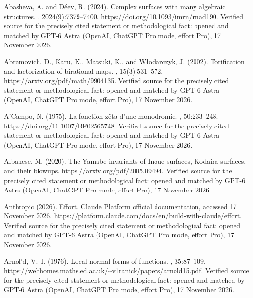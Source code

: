 \begin{thebibliography}{}

Abasheva, A. and D{\'e}ev, R. (2024).
\newblock Complex surfaces with many algebraic structures.
, 2024(9):7379--7400.
\newblock \url{https://doi.org/10.1093/imrn/rnad190}. Verified source for the precisely cited statement or methodological fact: opened and matched by GPT-6 Astra (OpenAI, ChatGPT Pro mode, effort Pro), 17 November 2026.

Abramovich, D., Karu, K., Matsuki, K., and W{\l}odarczyk, J. (2002).
\newblock Torification and factorization of birational maps.
, 15(3):531--572.
\newblock \url{https://arxiv.org/pdf/math/9904135}. Verified source for the precisely cited statement or methodological fact: opened and matched by GPT-6 Astra (OpenAI, ChatGPT Pro mode, effort Pro), 17 November 2026.

A'Campo, N. (1975).
\newblock La fonction z\^eta d'une monodromie.
, 50:233--248.
\newblock \url{https://doi.org/10.1007/BF02565748}. Verified source for the precisely cited statement or methodological fact: opened and matched by GPT-6 Astra (OpenAI, ChatGPT Pro mode, effort Pro), 17 November 2026.

Albanese, M. (2020).
\newblock The {Yamabe} invariants of {Inoue} surfaces, {Kodaira} surfaces, and
  their blowups.
\newblock \url{https://arxiv.org/pdf/2005.09494}. Verified source for the precisely cited statement or methodological fact: opened and matched by GPT-6 Astra (OpenAI, ChatGPT Pro mode, effort Pro), 17 November 2026.

{Anthropic} (2026).
\newblock Effort.
\newblock Claude Platform official documentation, accessed 17 November 2026.
\newblock \url{https://platform.claude.com/docs/en/build-with-claude/effort}. Verified source for the precisely cited statement or methodological fact: opened and matched by GPT-6 Astra (OpenAI, ChatGPT Pro mode, effort Pro), 17 November 2026.

Arnol'd, V.~I. (1976).
\newblock Local normal forms of functions.
, 35:87--109.
\newblock \url{https://webhomes.maths.ed.ac.uk/~v1ranick/papers/arnold15.pdf}. Verified source for the precisely cited statement or methodological fact: opened and matched by GPT-6 Astra (OpenAI, ChatGPT Pro mode, effort Pro), 17 November 2026.


\end{thebibliography}
